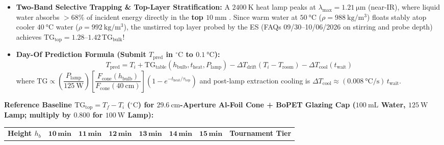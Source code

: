 \documentclass[10pt,twoside,openany,letterpaper]{book}
\begin{document}
\begin{quicksheet}
\begin{twocol}[0.51]
\begin{devicebox}
\scriptsize
\begin{itemize}
  \item \textbf{Two-Band Selective Trapping \& Top-Layer Stratification:}
  A $\SI{2400}{\kelvin}$ heat lamp peaks at $\lambda_{\max} = \SI{1.21}{\micro\meter}$ (near-IR), where liquid water absorbs $>68\%$ of incident energy directly in the \textbf{top $\SI{10}{\milli\meter}$} . Since warm water at $\SI{50}{\celsius}$ ($\rho = \SI{988}{\kilogram\per\cubic\meter}$) floats stably atop cooler $\SI{40}{\celsius}$ water ($\rho = \SI{992}{\kilogram\per\cubic\meter}$), the unstirred top layer probed by the ES (FAQs 09/30--10/06/2026 on stirring and probe depth) achieves $\mathbf{\mathrm{TG}_{\mathrm{top}} = 1.28\text{--}1.42\,\mathrm{TG}_{\mathrm{bulk}}}$!
  \item \textbf{Day-Of Prediction Formula (Submit $T_{\mathrm{pred}}$ in $^\circ\mathrm{C}$ to $\SI{0.1}{\celsius}$):}
  \[
    \boxed{T_{\mathrm{pred}} = T_i + \mathrm{TG}_{\mathrm{table}}(h_{\mathrm{bulb}}, t_{\mathrm{heat}}, P_{\mathrm{lamp}}) - \Delta T_{\mathrm{drift}}(T_i - T_{\mathrm{room}}) - \Delta T_{\mathrm{cool}}(t_{\mathrm{wait}})}
  \]
  where $\mathrm{TG} \propto \left(\dfrac{P_{\mathrm{lamp}}}{\SI{125}{\watt}}\right)\left[\dfrac{F_{\mathrm{cone}}(h_{\mathrm{bulb}})}{F_{\mathrm{cone}}(\SI{40}{\centi\meter})}\right]\left(1 - e^{-t_{\mathrm{heat}}/\tau_{\mathrm{top}}}\right)$ and post-lamp extraction cooling is $\Delta T_{\mathrm{cool}} \approx (\SI{0.008}{\celsius\per\second})\,t_{\mathrm{wait}}$.
\end{itemize}
\par\smallskip\noindent
\textbf{Reference Baseline $\mathrm{TG}_{\mathrm{top}} = T_f - T_i$ ($^\circ\mathrm{C}$) for $\SI{29.6}{\centi\meter}$-Aperture Al-Foil Cone + BoPET Glazing Cap ($\SI{100}{\milli\liter}$ Water, $\SI{125}{\watt}$ Lamp; multiply by $\mathbf{0.800}$ for $\SI{100}{\watt}$ Lamp):}
\par\smallskip\noindent
\scriptsize\setlength{\tabcolsep}{1.8pt}\renewcommand{\arraystretch}{1.08}
\begin{tabularx}{\linewidth}{@{}l | r r r r r r | X@{}}
\toprule
\textbf{Height $h_b$} & $\mathbf{10\,\si{\minute}}$ & $\mathbf{11\,\si{\minute}}$ & $\mathbf{12\,\si{\minute}}$ & $\mathbf{13\,\si{\minute}}$ & $\mathbf{14\,\si{\minute}}$ & $\mathbf{15\,\si{\minute}}$ & \textbf{Tournament Tier} \\

\end{tabularx}
\end{devicebox}
\end{twocol}
\end{quicksheet}
\end{document}
